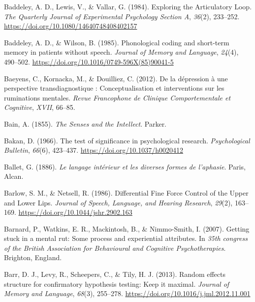 \documentclass[a4paper,12pt,twoside,openright,oldfontcommands,final]{memoir}
\begin{document}
\leavevmode\hypertarget{ref-baddeley_exploring_1984}{}%
Baddeley, A. D., Lewis, V., \& Vallar, G. (1984). Exploring the Articulatory Loop. \emph{The Quarterly Journal of Experimental Psychology Section A}, \emph{36}(2), 233--252. \url{https://doi.org/10.1080/14640748408402157}

\leavevmode\hypertarget{ref-baddeley_phonological_1985}{}%
Baddeley, A. D., \& Wilson, B. (1985). Phonological coding and short-term memory in patients without speech. \emph{Journal of Memory and Language}, \emph{24}(4), 490--502. \url{https://doi.org/10.1016/0749-596X(85)90041-5}

\leavevmode\hypertarget{ref-Baeyens2012}{}%
Baeyens, C., Kornacka, M., \& Douilliez, C. (2012). De la dépression à une perspective transdiagnostique : Conceptualisation et interventions sur les ruminations mentales. \emph{Revue Francophone de Clinique Comportementale et Cognitive}, \emph{XVII}, 66--85.

\leavevmode\hypertarget{ref-bain_senses_1855}{}%
Bain, A. (1855). \emph{The Senses and the Intellect}. Parker.

\leavevmode\hypertarget{ref-bakan_test_1966}{}%
Bakan, D. (1966). The test of significance in psychological research. \emph{Psychological Bulletin}, \emph{66}(6), 423--437. \url{https://doi.org/10.1037/h0020412}

\leavevmode\hypertarget{ref-ballet_langage_1886}{}%
Ballet, G. (1886). \emph{Le langage intérieur et les diverses formes de l'aphasie}. Paris, Alcan.

\leavevmode\hypertarget{ref-barlow_differential_1986}{}%
Barlow, S. M., \& Netsell, R. (1986). Differential Fine Force Control of the Upper and Lower Lips. \emph{Journal of Speech, Language, and Hearing Research}, \emph{29}(2), 163--169. \url{https://doi.org/10.1044/jshr.2902.163}

\leavevmode\hypertarget{ref-barnard_getting_2007}{}%
Barnard, P., Watkins, E. R., Mackintosh, B., \& Nimmo-Smith, I. (2007). Getting stuck in a mental rut: Some process and experiential attributes. In \emph{35th congress of the British Association for Behavioural and Cognitive Psychotherapies}. Brighton, England.

\leavevmode\hypertarget{ref-barr_random_2013-1}{}%
Barr, D. J., Levy, R., Scheepers, C., \& Tily, H. J. (2013). Random effects structure for confirmatory hypothesis testing: Keep it maximal. \emph{Journal of Memory and Language}, \emph{68}(3), 255--278. \url{https://doi.org/10.1016/j.jml.2012.11.001}
\end{document}
